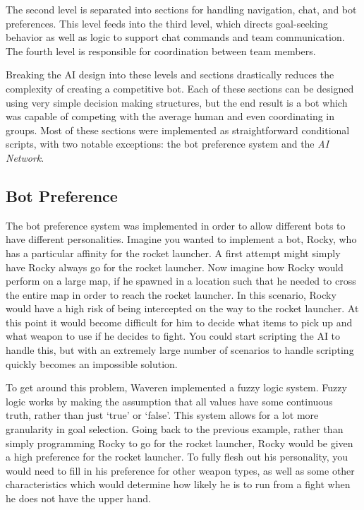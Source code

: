 The second level is separated into sections for handling navigation, chat, and bot preferences. This level feeds into the third level, which directs goal-seeking behavior as well as logic to support chat commands and team communication. The fourth level is responsible for coordination between team members.

Breaking the AI design into these levels and sections drastically reduces the complexity of creating a competitive bot. Each of these sections can be designed using very simple decision making structures, but the end result is a bot which was capable of competing with the average human and even coordinating in groups. Most of these sections were implemented as straightforward conditional scripts, with two notable exceptions: the bot preference system and the \emph{AI Network}.

\subsection{Bot Preference}

The bot preference system was implemented in order to allow different bots to have different personalities. Imagine you wanted to implement a bot, Rocky, who has a particular affinity for the rocket launcher. A first attempt might simply have Rocky always go for the rocket launcher. Now imagine how Rocky would perform on a large map, if he spawned in a location such that he needed to cross the entire map in order to reach the rocket launcher. In this scenario, Rocky would have a high risk of being intercepted on the way to the rocket launcher. At this point it would become difficult for him to decide what items to pick up and what weapon to use if he decides to fight. You could start scripting the AI to handle this, but with an extremely large number of scenarios to handle scripting quickly becomes an impossible solution.

To get around this problem, Waveren implemented a fuzzy logic system. \cite{q3bot} Fuzzy logic works by making the assumption that all values have some continuous truth, rather than just `true' or `false'. This system allows for a lot more granularity in goal selection. Going back to the previous example, rather than simply programming Rocky to go for the rocket launcher, Rocky would be given a high preference for the rocket launcher. To fully flesh out his personality, you would need to fill in his preference for other weapon types, as well as some other characteristics which would determine how likely he is to run from a fight when he does not have the upper hand.

